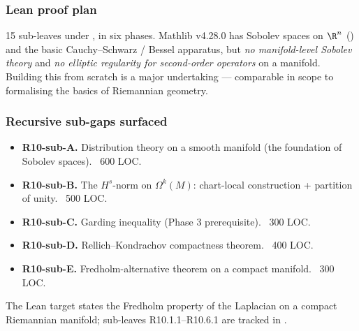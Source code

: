 \subsubsection*{Lean proof plan}

15 sub-leaves under
, in six phases.
Mathlib v4.28.0 has Sobolev spaces on \(\R^{n}\)
() and the basic
Cauchy--Schwarz / Bessel apparatus, but \emph{no manifold-level
Sobolev theory} and \emph{no elliptic regularity for second-order
operators} on a manifold.  Building this from scratch is a major
undertaking --- comparable in scope to formalising the basics of
Riemannian geometry.

\subsubsection*{Recursive sub-gaps surfaced}

\begin{itemize}
\item \textbf{R10-sub-A.}  Distribution theory on a smooth manifold
  (the foundation of Sobolev spaces).  ~600 LOC.
\item \textbf{R10-sub-B.}  The \(H^{s}\)-norm on \(\Omega^{k}(M)\):
  chart-local construction + partition of unity.  ~500 LOC.
\item \textbf{R10-sub-C.}  Garding inequality (Phase 3 prerequisite).
  ~300 LOC.
\item \textbf{R10-sub-D.}  Rellich--Kondrachov compactness theorem.
  ~400 LOC.
\item \textbf{R10-sub-E.}  Fredholm-alternative theorem on a compact
  manifold.  ~300 LOC.
\end{itemize}

\begin{theorem}
\label{input:sobolev-elliptic-regularity}
The Lean target
states the Fredholm property of the Laplacian on a compact Riemannian
manifold; sub-leaves R10.1.1--R10.6.1 are tracked in
.
\leanok
\end{theorem}


